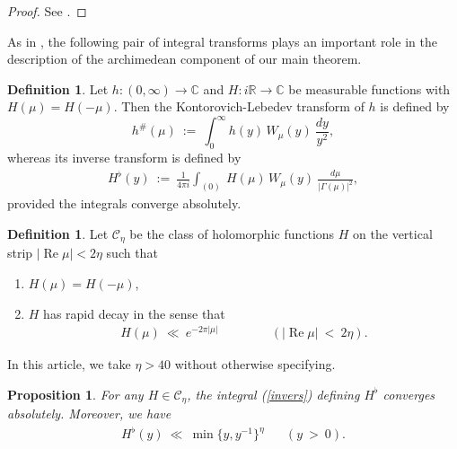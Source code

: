 \documentclass[11pt,reqno]{amsart}
\newtheorem{prop}[thm]{Proposition}
\theoremstyle{definition}
\theoremstyle{definition}
\newtheorem{defi}[thm]{Definition}
\theoremstyle{remark}
\newcommand{\R}{\ensuremath{\mathbb{R}}}
\newcommand{\C}{\ensuremath{\mathbb{C}}}
\numberwithin{equation}{section}
\DeclareMathOperator{\re}{Re}
\begin{document}
 
 \begin{proof}
 See  \cite{Bu88}.
 \end{proof}



As in \cite{Kw23, Kw23a+}, the following pair of integral transforms plays an important role in the description of the archimedean component of our main theorem. 

	\begin{defi}\label{defwhittrans}
	Let  $h: (0, \infty) \rightarrow \C$ and $H: i\R \rightarrow \C$ be  measurable functions with $H(\mu)=H(-\mu)$. Then the Kontorovich-Lebedev transform of $h$ is defined by
	\begin{equation}\label{eqn whitranseq}
	h^{\#}(\mu) \ := \ \int_{0}^{\infty} h(y)\, W_{\mu}(y) \ \frac{dy}{y^2},   
	\end{equation}
	whereas its inverse transform is defined by 
	\begin{align}\label{invers}
	H^{\flat}(y) \ :=  \ \frac{1}{4\pi i} \int_{(0)}  \ H(\mu)\, W_{\mu}(y) \ \frac{d\mu}{\left| \Gamma(\mu)\right|^2},
	\end{align}
	provided  the integrals converge absolutely. 	
	\end{defi}
	

		
		\begin{defi}
				Let $\mathcal{C}_{\eta}$ be the class of holomorphic functions $H$  on the vertical strip  $|\re \mu|< 2\eta$ such that 
				\begin{enumerate}
					\item $H(\mu)=H(-\mu)$,
					
					\item $H$ has rapid decay in the sense that
					\begin{align}\label{rapdeca}
					H(\mu) \ \ll \ e^{-2\pi|\mu|} \hspace{50pt} (|\re \mu| \ < \  2\eta). 
					\end{align}
				\end{enumerate}
				In this article, we take $\eta>40$ without otherwise specifying. 
			\end{defi}
			


	
	\begin{prop}\label{inKLconv}
	For any $H\in \mathcal{C}_{\eta}$, the integral  (\ref{invers}) defining $H^{\flat}$   converges absolutely. Moreover, we have 
				\begin{align}\label{decbdd}
			    H^{\flat}(y) \ \ll \ \min \{y, y^{-1}\}^{\eta} \hspace{20pt} (y \ > \ 0). 
				\end{align}
				 
		
		\end{prop}
		
\end{document}
